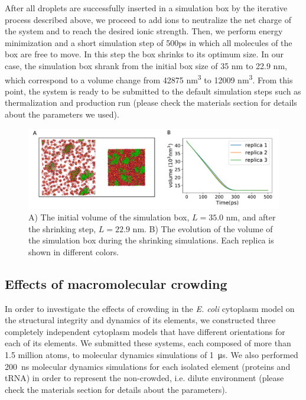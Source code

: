 \documentclass[journal=jacsat,manuscript=article]{achemso}
\begin{document}
After all droplets are successfully inserted in a simulation box by the iterative process described above, we proceed to add ions to neutralize the net charge of the system and to reach the desired ionic strength. Then, we perform energy minimization and a short simulation step of 500ps in which all molecules of the box are free to move. In this step the box shrinks to its optimum size. In our case, the simulation box shrank from the initial box size of 35 nm to 22.9 nm, which correspond to a volume change from 42875 nm\textsuperscript{3} to 12009 nm\textsuperscript{3}. From this point, the system is ready to be submitted to the default simulation steps such as thermalization and production run (please check the materials section for details about the parameters we used).

\begin{figure}[H]
\includegraphics[scale=0.5]{shrinking.pdf} 
\caption{A) The initial volume of the simulation box, $L=35.0$ nm, and after the shrinking step, $L=22.9$ nm. B) The evolution of the volume of the simulation box during the shrinking simulations. Each replica is shown in different colors. }
\end{figure}









\subsection{Effects of macromolecular crowding}

In order to investigate the effects of crowding in the \textit{E. coli} cytoplasm model on the structural integrity and dynamics of its elements, we constructed three completely independent cytoplasm models that have different orientations for each of its elements. We submitted these systems, each composed of more than 1.5 million atoms, to molecular dynamics simulations of \SI{1}{\micro\second}. We also performed \SI{200}{\nano\second} molecular dynamics simulations for each isolated element (proteins and tRNA) in order to represent the non-crowded, i.e. dilute environment (please check the materials section for details about the parameters).
\end{document}
